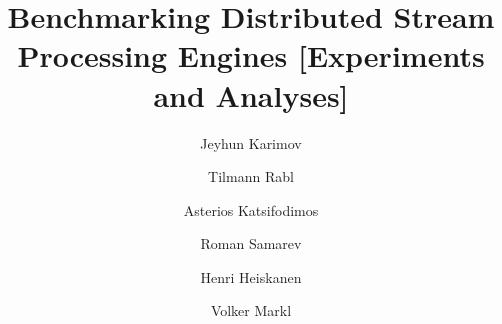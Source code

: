\documentclass{vldb}
\makeatletter
\renewcommand\AB@affilsepx{, \protect\Affilfont}
\makeatother
\begin{document}
\linespread{0.94}

\makeatletter
\renewcommand\AB@authnote[1]{\rlap{\textsuperscript{\normalfont#1}}}
\renewcommand\Authsep{\ \  \ \ \ \ \ \ \ \ \ }
\renewcommand\Authands{ \ \ \  \ \ \ \ \ }
\makeatother



\title{Benchmarking Distributed Stream Processing Engines [Experiments and Analyses]}
\renewcommand{\familydefault}{\sfdefault}
\author[1,4]{\large{Jeyhun Karimov}}
\author[1,2,5]{\large{ Tilmann Rabl}}
\author[1,5]{\large{ Asterios Katsifodimos}}
\author[2,6]{\large{ Roman Samarev}}
\author[3,7]{ \large{ Henri Heiskanen }}
\author[1,2,5]{\large{Volker Markl}}



 \makeatletter
\renewcommand\AB@affilsepx{ \\ \protect\Affilfont}
\makeatother


  \makeatletter
\renewcommand\AB@affilsepx{, \protect\Affilfont}
\makeatother


 

\setlength{\textfloatsep}{0.4cm}  %
\setlength{\abovecaptionskip}{0.5cm} %




%
%
%
%
\end{document}
